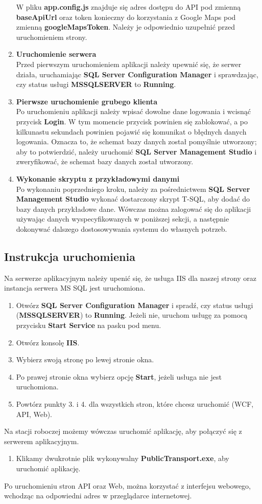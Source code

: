 \documentclass[10pt,a4paper]{article}
\begin{document}
\begin{enumerate}
	W pliku \textbf{app.config.js} znajduje się adres dostępu do API pod zmienną \textbf{baseApiUrl} oraz token konieczny do korzystania z Google Maps pod zmienną \textbf{googleMapsToken}. Należy je odpowiednio uzupełnić przed uruchomieniem strony.
	\item \textbf{Uruchomienie serwera} \\
	Przed pierwszym uruchomieniem aplikacji należy upewnić się, że serwer działa, uruchamiając \textbf{SQL Server Configuration Manager} i sprawdzając, czy status usługi \textbf{MSSQLSERVER} to \textbf{Running}.
	\item \textbf{Pierwsze uruchomienie grubego klienta} \\
	Po uruchomieniu aplikacji należy wpisać dowolne dane logowania i wcisnąć przycisk \textbf{Login}. W tym momencie przycisk powinien się zablokować, a po kilkunastu sekundach powinien pojawić się komunikat o błędnych danych logowania. Oznacza to, że schemat bazy danych został pomyślnie utworzony; aby to potwierdzić, należy uruchomić \textbf{SQL Server Management Studio} i zweryfikować, że schemat bazy danych został utworzony.
	\item \textbf{Wykonanie skryptu z przykładowymi danymi} \\
	Po wykonaniu poprzedniego kroku, należy za pośrednictwem \textbf{SQL Server Management Studio} wykonać dostarczony skrypt T-SQL, aby dodać do bazy danych przykładowe dane. Wówczas można zalogować się do aplikacji używając danych wyspecyfikowanych w poniższej sekcji, a następnie dokonywać dalszego dostosowywania systemu do własnych potrzeb.
\end{enumerate}

\subsection{Instrukcja uruchomienia}
Na serwerze aplikacyjnym należy upenić się, że usługa IIS dla naszej strony oraz instancja serwera MS SQL jest uruchomiona. 
\begin{enumerate}
	\item Otwórz \textbf{SQL Server Configuration Manager} i spradź, czy status usługi (\textbf{MSSQLSERVER}) to \textbf{Running}. Jeżeli nie, uruchom usługę za pomocą przycisku \textbf{Start Service} na pasku pod menu.
	\item Otwórz konsolę \textbf{IIS}.
	\item Wybierz swoją stronę po lewej stronie okna.
	\item Po prawej stronie okna wybierz opcję \textbf{Start}, jeżeli usługa nie jest uruchomiona.
	\item Powtórz punkty 3. i 4. dla wszystkich stron, które chcesz uruchomić (WCF, API, Web).
\end{enumerate}
Na stacji roboczej możemy wówczas uruchomić aplikację, aby połączyć się z serwerem aplikacyjnym.
\begin{enumerate}
	\item Klikamy dwukrotnie plik wykonywalny \textbf{PublicTransport.exe}, aby uruchomić aplikację.
\end{enumerate}
Po uruchomieniu stron API oraz Web, można korzystać z interfejsu webowego, wchodząc na odpowiedni adres w przeglądarce internetowej.
\end{document}
